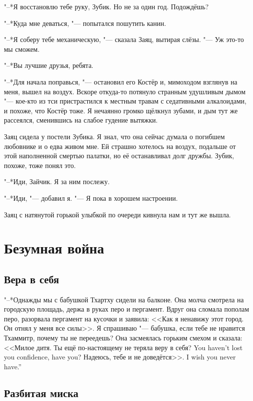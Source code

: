 "--*Я восстановлю тебе руку, Зубик.
Но не за один год.
Подождёшь?

"--*Куда мне деваться, "--- попытался пошутить канин.

"--*Я соберу тебе механическую, "--- сказала Заяц, вытирая слёзы.
"--- Уж это-то мы сможем.

"--*Вы лучшие друзья, ребята.

"--*Для начала поправься, "--- остановил его Костёр и, мимоходом взглянув на меня, вышел на воздух.
Вскоре откуда-то потянуло странным удушливым дымом "--- кое-кто из тси пристрастился к местным травам с седативными алкалоидами, и похоже, что Костёр тоже.
Я нечаянно громко щёлкнул зубами, и дым тут же рассеялся, сменившись на слабое гудение вытяжки.

Заяц сидела у постели Зубика.
Я знал, что она сейчас думала о погибшем любовнике и о едва живом мне.
Ей страшно хотелось на воздух, подальше от этой наполненной смертью палатки, но её останавливал долг дружбы.
Зубик, похоже, тоже понял это.

"--*Иди, Зайчик.
Я за ним послежу.

"--*Иди, "--- добавил я.
"--- Я пока в хорошем настроении.

Заяц с натянутой горькой улыбкой по очереди кивнула нам и тут же вышла.

\chapter{Безумная война}

\section{Вера в себя}

"--*Однажды мы с бабушкой Тхартху сидели на балконе.
Она молча смотрела на городскую площадь, держа в руках перо и пергамент.
Вдруг она сломала пополам перо, разорвала пергамент на кусочки и заявила: <<Как я ненавижу этот город.
Он отнял у меня все силы>>.
Я спрашиваю "--- бабушка, если тебе не нравится Тхаммитр, почему ты не переедешь?
Она засмеялась горьким смехом и сказала: <<Милое дитя.
{Ты ещё по-настоящему не теряла веру в себя?}
{You haven't lost you confidence, have you?}
{Надеюсь, тебе и не доведётся>>.}
{I wish you never have.''}

\section{Разбитая миска}

